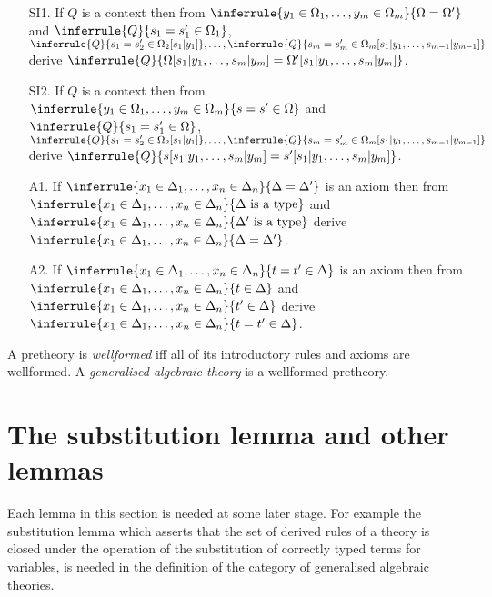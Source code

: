\begin{definition}[2(b)]
\begin{enumerate}
\item [SI1.] If $Q$ is a context then from $\inferrule{y_1\in\Omega_1,\ldots,y_m\in\Omega_m}{\Omega=\Omega'}$ and $\inferrule{Q}{s_1=s_1'\in\Omega_1}$, $\inferrule{Q}{s_1=s_2'\in\Omega_2[s_1|y_1]},\ldots,\inferrule{Q}{s_m=s_m'\in\Omega_m[s_1|y_1,\ldots,s_{m-1}|y_{m-1}]}$ derive $\inferrule{Q}{\Omega[s_1|y_1,\ldots,s_m|y_m]=\Omega'[s_1|y_1,\ldots,s_m|y_m]}$.
\item [SI2.] If $Q$ is a context then from $\inferrule{y_1\in\Omega_1,\ldots,y_m\in\Omega_m}{s=s'\in\Omega}$ and $\inferrule{Q}{s_1=s_1'\in\Omega}$, $\inferrule{Q}{s_1=s_2'\in\Omega_2[s_1|y_1]},\ldots,\inferrule{Q}{s_m=s_m'\in\Omega_m[s_1|y_1,\ldots,s_{m-1}|y_{m-1}]}$ derive $\inferrule{Q}{s[s_1|y_1,\ldots,s_m|y_m]=s'[s_1|y_1,\ldots,s_m|y_m]}$.
\item [A1.] If $\inferrule{x_1\in\Delta_1,\ldots,x_n\in\Delta_n}{\Delta=\Delta'}$ is an axiom then from $\inferrule{x_1\in\Delta_1,\ldots,x_n\in\Delta_n}{\Delta\isatype}$ and $\inferrule{x_1\in\Delta_1,\ldots,x_n\in\Delta_n}{\Delta'\isatype}$ derive $\inferrule{x_1\in\Delta_1,\ldots,x_n\in\Delta_n}{\Delta=\Delta'}$.
\item [A2.] If $\inferrule{x_1\in\Delta_1,\ldots,x_n\in\Delta_n}{t=t'\in\Delta}$ is an axiom then from $\inferrule{x_1\in\Delta_1,\ldots,x_n\in\Delta_n}{t\in\Delta}$ and $\inferrule{x_1\in\Delta_1,\ldots,x_n\in\Delta_n}{t'\in\Delta}$ derive $\inferrule{x_1\in\Delta_1,\ldots,x_n\in\Delta_n}{t=t'\in\Delta}$.
\end{enumerate}
\end{definition}

\begin{definition}[3]
A pretheory is \emph{wellformed} iff all of its introductory rules and axioms are wellformed.
%
A \emph{generalised algebraic theory} is a wellformed pretheory.
\end{definition}


\section{The substitution lemma and other lemmas} \label{sec:source-1-7}

Each lemma in this section is needed at some later stage.
%
For example the substitution lemma which asserts that the set of derived rules of a theory is closed under the operation of the substitution of correctly typed terms for variables, is needed in the definition of the category of generalised algebraic theories.



